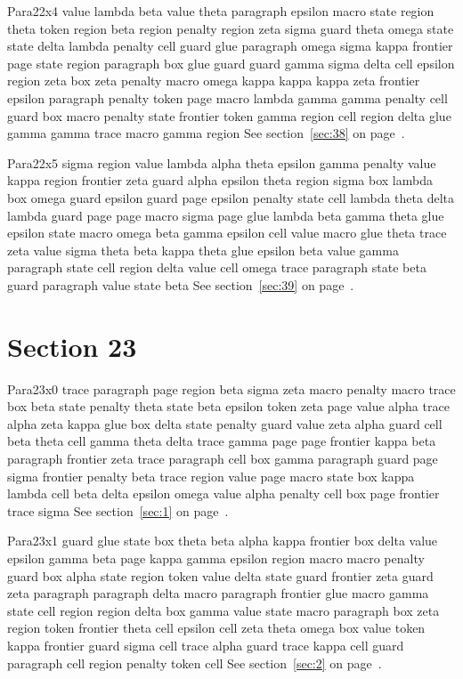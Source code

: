 \documentclass{article}
\begin{document}
Para22x4 value lambda beta value theta paragraph epsilon macro state region theta token region beta region penalty region zeta sigma guard theta omega state state delta lambda penalty cell guard glue paragraph omega sigma kappa frontier page state region paragraph box glue guard guard gamma sigma delta cell epsilon region zeta box zeta penalty macro omega kappa kappa kappa zeta frontier epsilon paragraph penalty token page macro lambda gamma gamma penalty cell guard box macro penalty state frontier token gamma region cell region delta glue gamma gamma trace macro gamma region See section~\ref{sec:38} on page~\pageref{sec:30}.

Para22x5 sigma region value lambda alpha theta epsilon gamma penalty value kappa region frontier zeta guard alpha epsilon theta region sigma box lambda box omega guard epsilon guard page epsilon penalty state cell lambda theta delta lambda guard page page macro sigma page glue lambda beta gamma theta glue epsilon state macro omega beta gamma epsilon cell value macro glue theta trace zeta value sigma theta beta kappa theta glue epsilon beta value gamma paragraph state cell region delta value cell omega trace paragraph state beta guard paragraph value state beta See section~\ref{sec:39} on page~\pageref{sec:31}.

\section{Section 23}\label{sec:23}
Para23x0 trace paragraph page region beta sigma zeta macro penalty macro trace box beta state penalty theta state beta epsilon token zeta page value alpha trace alpha zeta kappa glue box delta state penalty guard value zeta alpha guard cell beta theta cell gamma theta delta trace gamma page page frontier kappa beta paragraph frontier zeta trace paragraph cell box gamma paragraph guard page sigma frontier penalty beta trace region value page macro state box kappa lambda cell beta delta epsilon omega value alpha penalty cell box page frontier trace sigma See section~\ref{sec:1} on page~\pageref{sec:29}.

Para23x1 guard glue state box theta beta alpha kappa frontier box delta value epsilon gamma beta page kappa gamma epsilon region macro macro penalty guard box alpha state region token value delta state guard frontier zeta guard zeta paragraph paragraph delta macro paragraph frontier glue macro gamma state cell region region delta box gamma value state macro paragraph box zeta region token frontier theta cell epsilon cell zeta theta omega box value token kappa frontier guard sigma cell trace alpha guard trace kappa cell guard paragraph cell region penalty token cell See section~\ref{sec:2} on page~\pageref{sec:30}.
\end{document}
